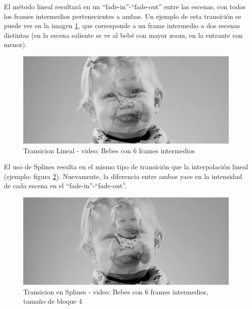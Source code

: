 \par El m\'etodo lineal resultar\'a en un ``fade-in''-``fade-out'' entre las escenas, con todos los frames intermedios pertenecientes a ambas.
Un ejemplo de esta transici\'on se puede ver en la imagen \ref{BebesLinealTransicion}, que corresponde a un frame intermedio a dos escenas distintas (en la escena saliente se ve al beb\'e con mayor zoom, en la entrante con menor).

\FloatBarrier
\begin{figure}[h]
\caption{Transicion Lineal - video: Bebes con 6 frames intermedios}
\label{BebesLinealTransicion}
\includegraphics[width=0.9\columnwidth]{imagenes/cualitativos/BLT.png}
\end{figure}
\FloatBarrier

\par El uso de Splines resulta en el mismo tipo de transici\'on que la interpolaci\'on lineal (ejemplo: figura \ref{BebesSplinesTransicion}).
Nuevamente, la diferencia entre ambos yace en la intensidad de cada escena en el ``fade-in''-``fade-out''.

\FloatBarrier
\begin{figure}[h]
\caption{Transicion en Splines - video: Bebes con 6 frames intermedios, tama\~no de bloque 4}
\label{BebesSplinesTransicion}
\includegraphics[width=0.9\columnwidth]{imagenes/cualitativos/BST.png}
\end{figure}
\FloatBarrier

